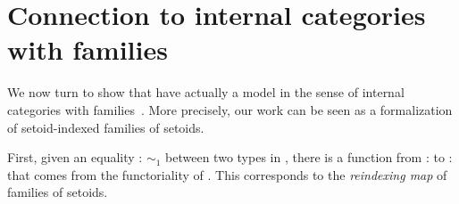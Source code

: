 
\begin{coqdoccode}
\coqdocemptyline
\coqdocemptyline
\end{coqdoccode}
\section{Connection to internal categories with families}




  We now turn to show that have actually a model in the sense of internal categories with families~\cite{dybjer:internaltt}. More precisely, our work can be seen as a formalization of setoid-indexed families of setoids. 


  First, given an equality  :  $\sim_1$  between two types in  , there is a function 
  from  :   to    :   that comes from the
  functoriality of \coqdocvar{$\Pi$}. This corresponds to the \emph{reindexing
  map} of families of setoids.
\begin{coqdoccode}
\coqdocemptyline
\coqdocemptyline
\end{coqdoccode}
